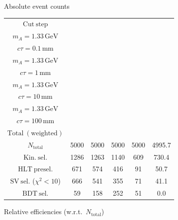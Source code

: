 \documentclass[10pt,a4paper]{article}
\renewcommand{\arraystretch}{1.4}
\begin{document}
{\footnotesize\setlength{\tabcolsep}{4pt}\renewcommand{\arraystretch}{1.05}%
\vspace{12pt}

Absolute event counts

\begin{tabular}{cccccc}
\toprule
$\mathrm{Cut\ step}$ & \shortstack{$m_{\pi}=4\,\mathrm{GeV}$\\$m_{A}=1.33\,\mathrm{GeV}$\\$c\tau=0.1\,\mathrm{mm}$} & \shortstack{$m_{\pi}=4\,\mathrm{GeV}$\\$m_{A}=1.33\,\mathrm{GeV}$\\$c\tau=1\,\mathrm{mm}$} & \shortstack{$m_{\pi}=4\,\mathrm{GeV}$\\$m_{A}=1.33\,\mathrm{GeV}$\\$c\tau=10\,\mathrm{mm}$} & \shortstack{$m_{\pi}=4\,\mathrm{GeV}$\\$m_{A}=1.33\,\mathrm{GeV}$\\$c\tau=100\,\mathrm{mm}$} & \shortstack{$\mathrm{QCD}$\\$\mathrm{Total\ (weighted)}$} \\
\midrule
$N_{\mathrm{total}}$ & 5000 & 5000 & 5000 & 5000 & 4995.7\\
$\mathrm{Kin.\ sel.}$ & 1286 & 1263 & 1140 & 609 & 730.4\\
$\mathrm{HLT\ presel.}$ & 671 & 574 & 416 & 91 & 50.7\\
$\mathrm{SV\ sel.}$ ($\chi^2{<}10$) & 666 & 541 & 355 & 71 & 41.1\\
$\mathrm{BDT\ sel.}$ & 59 & 158 & 252 & 51 & 0.0\\
\bottomrule
\end{tabular}

\vspace{18pt}

Relative efficiencies (w.r.t.\ $N_{\mathrm{total}}$)

}
\end{document}

